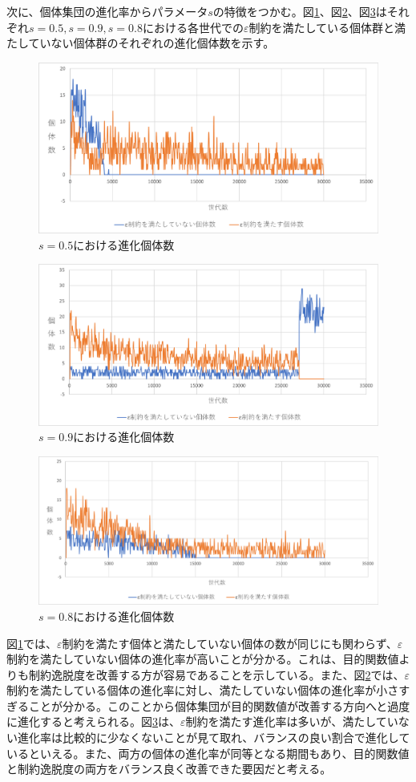 \documentclass[a4paper,12pt]{jsreport}
\begin{document}
次に、個体集団の進化率からパラメータ$s$の特徴をつかむ。図\ref{fig:evo0.5}、図\ref{fig:evo0.9}、図\ref{fig:evo0.8}はそれぞれ$s=0.5,s=0.9,s=0.8$における各世代での$\varepsilon$制約を満たしている個体群と満たしていない個体群のそれぞれの進化個体数を示す。


\begin{figure}[htbp]
  \centering
  \includegraphics[width=.7\linewidth]{fig3/evo/s=0.5_evo.eps}
  \caption{$s=0.5$における進化個体数}
  \label{fig:evo0.5}
\end{figure}

\begin{figure}[htbp]
  \centering
  \includegraphics[width=.7\linewidth]{fig3/evo/s=0.9_evo.eps}
  \caption{$s=0.9$における進化個体数}
  \label{fig:evo0.9}
\end{figure}

\begin{figure}[htbp]
  \centering
  \includegraphics[width=.7\linewidth]{fig3/evo/s=0.8_evo.eps}
  \caption{$s=0.8$における進化個体数}
  \label{fig:evo0.8}
\end{figure}

図\ref{fig:evo0.5}では、$\varepsilon$制約を満たす個体と満たしていない個体の数が同じにも関わらず、$\varepsilon$制約を満たしていない個体の進化率が高いことが分かる。これは、目的関数値よりも制約逸脱度を改善する方が容易であることを示している。また、図\ref{fig:evo0.9}では、$\varepsilon$制約を満たしている個体の進化率に対し、満たしていない個体の進化率が小さすぎることが分かる。このことから個体集団が目的関数値が改善する方向へと過度に進化すると考えられる。図\ref{fig:evo0.8}は、$\varepsilon$制約を満たす進化率は多いが、満たしていない進化率は比較的に少なくないことが見て取れ、バランスの良い割合で進化しているといえる。また、両方の個体の進化率が同等となる期間もあり、目的関数値と制約逸脱度の両方をバランス良く改善できた要因だと考える。
\end{document}
